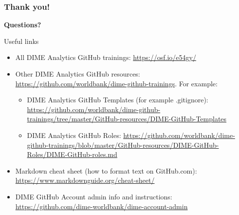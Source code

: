 \documentclass[aspectratio=169]{beamer}
\newcommand{\trainingURL}[1]{{\color{blue}\url{#1}}}
\begin{document}
\begin{frame}
	\frametitle{Thank you!}
	\huge\centering \textbf{Questions?}

\end{frame}

\begin{frame}{Useful links}
	\begin{itemize}
	  \item All DIME Analytics GitHub trainings: \trainingURL{https://osf.io/e54gy/}
	  \item Other DIME Analytics GitHub resources: \trainingURL{https://github.com/worldbank/dime-github-trainings}. For example:
		\begin{itemize}
			\item DIME Analytics GitHub Templates (for example .gitignore): \trainingURL{https://github.com/worldbank/dime-github-trainings/tree/master/GitHub-resources/DIME-GitHub-Templates}
			\item DIME Analytics GitHub Roles: \trainingURL{https://github.com/worldbank/dime-github-trainings/blob/master/GitHub-resources/DIME-GitHub-Roles/DIME-GitHub-roles.md}
		\end{itemize}
		\item Markdown cheat sheet (how to format text on GitHub.com):  \trainingURL{https://www.markdownguide.org/cheat-sheet/}
		\item DIME GitHub Account admin info and instructions: \trainingURL{https://github.com/dime-worldbank/dime-account-admin}
	\end{itemize}
\end{frame}
\end{document}

